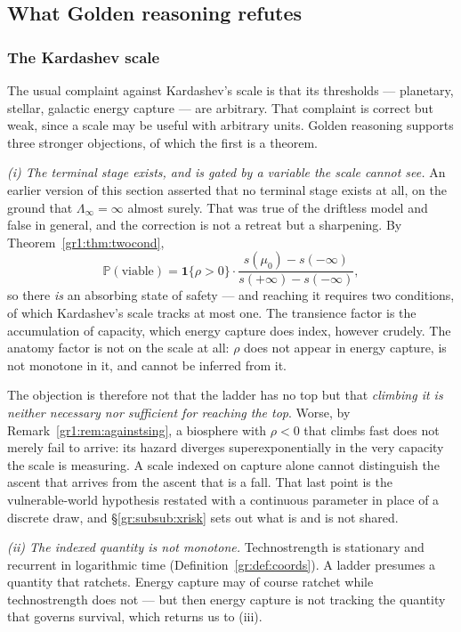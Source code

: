 \documentclass[11pt]{article}
\numberwithin{equation}{section}
\theoremstyle{plain}
\theoremstyle{definition}
\theoremstyle{remark}
\newcommand{\PP}{\mathbb{P}}
\newcommand{\one}{\mathbf{1}}
\begin{document}
\subsection{What Golden reasoning refutes}\label{gr:sub:refutes}

\subsubsection{The Kardashev scale}\label{gr:subsub:kardashev}

The usual complaint against Kardashev's scale \cite{Kar64} is that its
thresholds --- planetary, stellar, galactic energy capture --- are
arbitrary. That complaint is correct but weak, since a scale may be
useful with arbitrary units. Golden reasoning supports three stronger
objections, of which the first is a theorem.

\emph{(i) The terminal stage exists, and is gated by a variable the
scale cannot see.} An earlier version of this section asserted that no
terminal stage exists at all, on the ground that
$\Lambda_\infty=\infty$ almost surely. That was true of the driftless
model and false in general, and the correction is not a retreat but a
sharpening. By Theorem~\ref{gr1:thm:twocond},
\[
\PP(\text{viable})=\one\{\rho>0\}\cdot
\frac{s(\mu_0)-s(-\infty)}{s(+\infty)-s(-\infty)},
\]
so there \emph{is} an absorbing state of safety --- and reaching it
requires two conditions, of which Kardashev's scale tracks at most one.
The transience factor is the accumulation of capacity, which energy
capture does index, however crudely. The anatomy factor is not on the
scale at all: $\rho$ does not appear in energy capture, is not
monotone in it, and cannot be inferred from it.

The objection is therefore not that the ladder has no top but that
\emph{climbing it is neither necessary nor sufficient for reaching the
top}. Worse, by Remark~\ref{gr1:rem:againstsing}, a biosphere with
$\rho<0$ that climbs fast does not merely fail to arrive: its hazard
diverges superexponentially in the very capacity the scale is
measuring. A scale indexed on capture alone cannot distinguish the
ascent that arrives from the ascent that is a fall. That last point is
the vulnerable-world hypothesis \cite{Bostrom19} restated with a
continuous parameter in place of a discrete draw, and
\S\ref{gr:subsub:xrisk} sets out what is and is not shared.

\emph{(ii) The indexed quantity is not monotone.} Technostrength is
stationary and recurrent in logarithmic time
(Definition~\ref{gr:def:coords}). A ladder presumes a quantity that
ratchets. Energy capture may of course ratchet while technostrength does
not --- but then energy capture is not tracking the quantity that
governs survival, which returns us to (iii).
\end{document}
